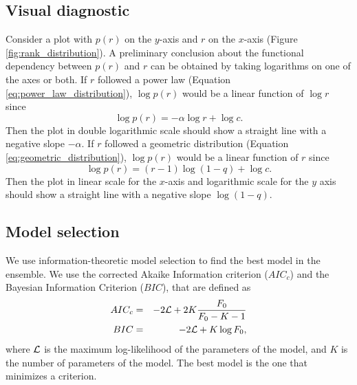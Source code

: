 \documentclass[USenglish]{article}
\newcommand{\loglikelihood}{{\cal L}}
\begin{document}
\subsection{Visual diagnostic}

\label{subsec:visual_diagnostic}

Consider a plot with $p(r)$ on the $y$-axis and $r$ on the $x$-axis (Figure \ref{fig:rank_distribution}).
A preliminary conclusion about the functional dependency between $p(r)$ and $r$ can be obtained by taking logarithms on one of the axes or both. 
If $r$ followed a power law (Equation \ref{eq:power_law_distribution}), $\log p(r)$ would be a linear function of $\log r$ since
\begin{equation*}
\log p(r) = -\alpha \log r + \log c.
\end{equation*}
Then the plot in double logarithmic scale should show a straight line with a negative slope $-\alpha$. 
If $r$ followed a geometric distribution (Equation \ref{eq:geometric_distribution}), $\log p(r)$ would be a linear function of $r$ since
\begin{equation*}
\log p(r) = (r - 1) \log (1 - q) + \log c.
\end{equation*}
Then the plot in linear scale for the $x$-axis and logarithmic scale for the $y$ axis should show a straight line with a negative slope $\log (1-q)$. 

\subsection{Model selection}
 
We use information-theoretic model selection to find the best model in the ensemble.  
We use the corrected Akaike Information criterion ($AIC_c$) and the Bayesian Information Criterion ($BIC$), that are defined as \citep{Burnham2002a,Wagenmakers2004a}
\begin{eqnarray}
AIC_c & = & -2\loglikelihood + 2 K \frac{F_0}{F_0 - K - 1} \nonumber \\
BIC   & = & -2\loglikelihood + K \log F_0, \label{eq:BIC}
\end{eqnarray}
where $\loglikelihood$ is the maximum log-likelihood of the parameters of the model, and $K$ is the number of parameters of the model.
The best model is the one that minimizes a criterion.
\end{document}
